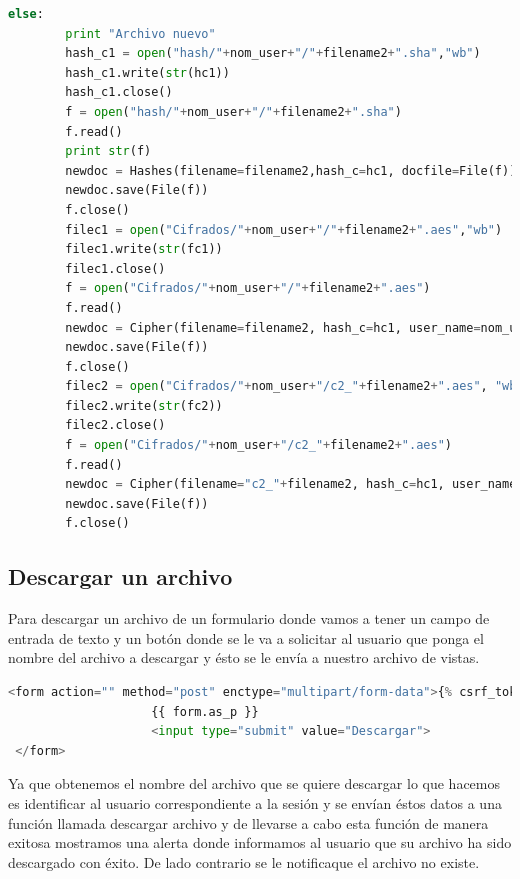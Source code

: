 \begin{lstlisting}[language=Python,frame=single, keywordstyle=\color{blue},breaklines=true, showstringspaces=false]
else:
        print "Archivo nuevo"
        hash_c1 = open("hash/"+nom_user+"/"+filename2+".sha","wb")
        hash_c1.write(str(hc1))
        hash_c1.close()
        f = open("hash/"+nom_user+"/"+filename2+".sha")
        f.read()
        print str(f)
        newdoc = Hashes(filename=filename2,hash_c=hc1, docfile=File(f))
        newdoc.save(File(f))
        f.close()
        filec1 = open("Cifrados/"+nom_user+"/"+filename2+".aes","wb")
        filec1.write(str(fc1))
        filec1.close()
        f = open("Cifrados/"+nom_user+"/"+filename2+".aes")
        f.read()
        newdoc = Cipher(filename=filename2, hash_c=hc1, user_name=nom_user, docfile=File(f))
        newdoc.save(File(f))
        f.close()
        filec2 = open("Cifrados/"+nom_user+"/c2_"+filename2+".aes", "wb")
        filec2.write(str(fc2))
        filec2.close()
        f = open("Cifrados/"+nom_user+"/c2_"+filename2+".aes")
        f.read()
        newdoc = Cipher(filename="c2_"+filename2, hash_c=hc1, user_name=nom_user, docfile=File(f))
        newdoc.save(File(f))
        f.close()
\end{lstlisting}

\subsection{Descargar un archivo} 

Para descargar un archivo de un formulario donde vamos a tener un campo de entrada de texto y un botón donde se le va a solicitar al usuario que ponga el nombre del archivo a descargar y ésto se le envía a nuestro archivo de vistas.

\begin{lstlisting}[language=Python,frame=single, keywordstyle=\color{blue},breaklines=true, showstringspaces=false]
 <form action="" method="post" enctype="multipart/form-data">{% csrf_token %}
                    {{ form.as_p }}
                    <input type="submit" value="Descargar">
 </form>
\end{lstlisting}

Ya que obtenemos el nombre del archivo que se quiere descargar lo que hacemos es identificar al usuario correspondiente a la sesión y se envían éstos datos a una función llamada descargar archivo y de llevarse a cabo esta función de manera exitosa mostramos una alerta donde informamos al usuario que su archivo ha sido descargado con éxito. De lado contrario se le notificaque el archivo no existe.

